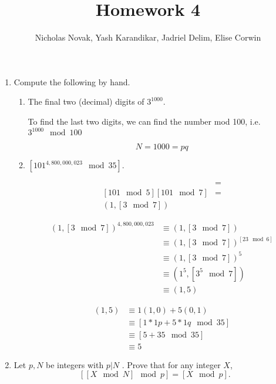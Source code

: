 \documentclass{article}
\title{Homework 4}
\date{}
\author{Nicholas Novak, Yash Karandikar, Jadriel Delim, Elise Corwin}
\begin{document}
\maketitle

\begin{enumerate}
  \item Compute the following by hand.
    \begin{enumerate}
      \item The final two (decimal) digits of $3^{1000}$.

        To find the last two digits, we can find the number mod 100, i.e.
        $3^{1000} \mod 100$

        \[
          N = 1000 = pq
        \]

      \item $[101^{4,800,000,023} \mod 35]$.

        \begin{align*}
          [101^{4,800,000,023} \mod 35] &=\\
          [101 \mod 5][101 \mod 7] &=\\
          (1, [3 \mod 7])
        \end{align*}

        \begin{align*}
          (1, [3 \mod 7])^{4,800,000,023} &\equiv (1, [3 \mod 7])\\
                                          &\equiv (1, [3 \mod 7])^{[23 \mod
                                          6]}\\
                                          &\equiv (1, [3 \mod 7])^5\\
                                          &\equiv (1^5, [3^5 \mod 7])\\
                                          &\equiv (1, 5)
        \end{align*}

        \begin{align*}
          (1, 5) &\equiv 1(1, 0) + 5(0, 1)\\
                 &\equiv [1 * 1p + 5 * 1q \mod 35]\\
                 &\equiv [5 + 35 \mod 35]\\
                 &\equiv \boxed{5}
        \end{align*}

    \end{enumerate}
  \item Let $p, N$ be integers with $p | N$ . Prove that for any integer $X$,
    \[
      [[X \mod N ] \mod p ] = [X \mod p ].
    \]


\end{enumerate}
\end{document}
